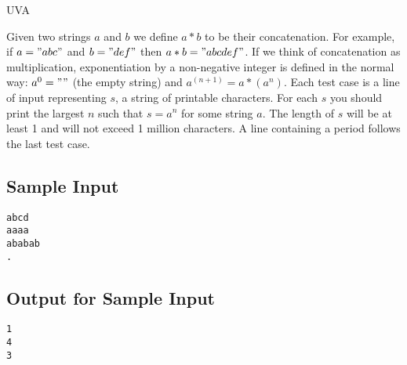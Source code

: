 

\noindent
UVA \bigskip

Given two strings $a$ and $b$ we define $a*b$ to be their concatenation. For example, if $a = "abc"$ and $b = "def"$ then $a*b = "abcdef"$. If we think of concatenation as multiplication, exponentiation by a non-negative integer is defined in the normal way: $a^0 = ""$ (the empty string) and $a^(n+1) = a*(a^n)$.
Each test case is a line of input representing $s$, a string of printable characters. For each $s$ you should print the largest $n$ such that $s = a^n$ for some string $a$. The length of $s$ will be at least 1 and will not exceed 1 million characters. A line containing a period follows the last test case.

\subsection*{Sample Input}

\begin{verbatim}
abcd
aaaa
ababab
.
\end{verbatim}

\subsection*{Output for Sample Input}

\begin{verbatim}
1
4
3
\end{verbatim}
